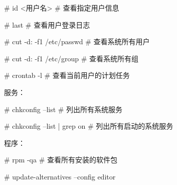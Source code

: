 \# id <用户名> \# 查看指定用户信息

\# last \# 查看用户登录日志

\# cut -d: -f1 /etc/passwd \# 查看系统所有用户

\# cut -d: -f1 /etc/group \# 查看系统所有组

\# crontab -l \# 查看当前用户的计划任务

服务：

\# chkconfig –list \# 列出所有系统服务

\# chkconfig –list | grep on \# 列出所有启动的系统服务

程序：

\# rpm -qa \# 查看所有安装的软件包

\# update-alternatives --config editor




\clearpage

